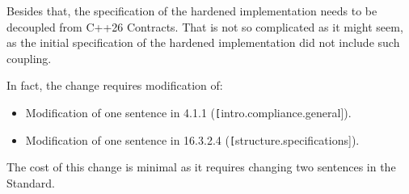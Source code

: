 Besides that, the specification of the hardened implementation needs to be
decoupled from C++26 Contracts. That is not so complicated as it might seem, as the
initial specification of the hardened implementation did not include such
coupling.

In fact, the change requires modification of:

\begin{itemize}

\item
Modification of one sentence in 4.1.1 (\texttt[intro.compliance.general]).

\item
Modification of one sentence in 16.3.2.4 (\texttt[structure.specifications]).

\end{itemize}

\vspace{1em}
\begin{tcolorbox}[
  colback=blue!8!white,
  colframe=blue,
  title={\textbf{Cost of removing hardening dependency}},
  breakable,
  width=\textwidth,
  boxrule=0.5pt
  ]
The cost of this change is minimal as it requires changing two sentences in the
Standard.
\end{tcolorbox}
